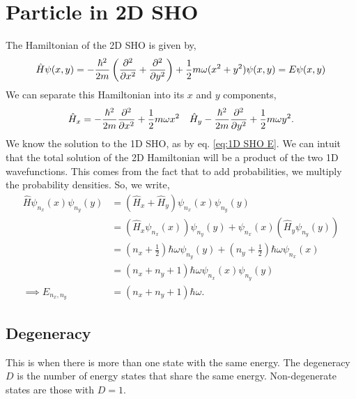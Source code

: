\documentclass{book}
\begin{document}
\section{Particle in 2D SHO}
The Hamiltonian of the 2D SHO is given by,
\begin{equation}
	\hat{H}\psi(x,y) = -\frac{\hbar^2}{2m}\left(\pdv[2]{x} + \pdv[2]{y}\right) + \frac{1}{2}m\omega (x^2 + y^2)\psi(x,y) = E\psi(x,y)
\end{equation}
We can separate this Hamiltonian into its $x$ and $y$ components,
\begin{align}
	\hat{H}_x = -\frac{\hbar^2}{2m}\pdv[2]{x} + \frac{1}{2}m\omega x^2 && \hat{H}_y -\frac{\hbar^2}{2m}\pdv[2]{y} + \frac{1}{2}m\omega y^2.
\end{align}
We know the solution to the 1D SHO, as by eq. \eqref{eq:1D SHO E}. We can intuit that the total solution of the 2D Hamiltonian will be a product of the two 1D wavefunctions. This comes from the fact that to add probabilities, we multiply the probability densities. So, we write,
\begin{equation}
	\begin{split}
		\hat{H}\psi_{n_x}(x)\psi_{n_y}(y) & = \left(\hat{H}_x + \hat{H}_y\right)\psi_{n_x}(x)\psi_{n_y}(y) \\
		& = \left(\hat{H}_x\psi_{n_x}(x)\right) \psi_{n_y}(y) + \psi_{n_x}(x)\left(\hat{H}_y\psi_{n_y}(y)\right) \\
		& = \left(n_x + \frac{1}{2}\right)\hbar\omega \psi_{n_y}(y) + \left(n_y + \frac{1}{2}\right)\hbar \omega \psi_{n_x}(x) \\
		& = \left(n_x + n_y + 1\right)\hbar \omega \psi_{n_x}(x)\psi_{n_y}(y) \\
		\implies E_{n_x,n_y} &= (n_x + n_y + 1)\hbar \omega.
	\end{split}
\end{equation}
\subsection{Degeneracy}
This is when there is more than one state with the same energy. The degeneracy $D$ is the number of energy states that share the same energy. Non-degenerate states are those with $D = 1$. 
\end{document}
